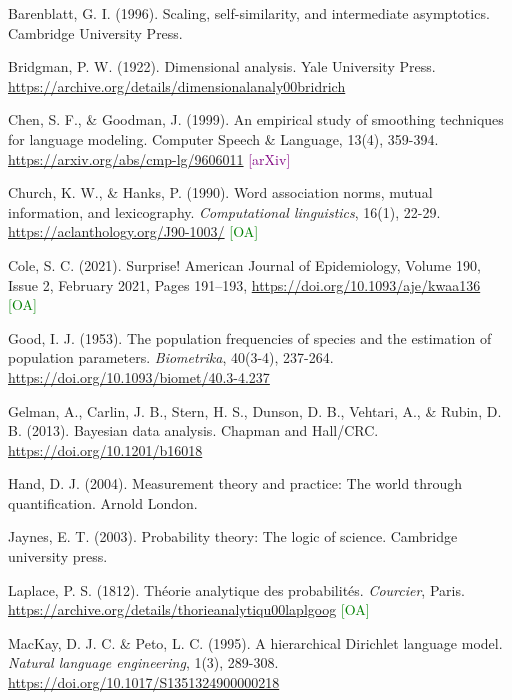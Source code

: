 \documentclass[12pt,a4paper]{article}
\newcommand{\openaccess}{{\small\textcolor{green}{[OA]}}}
\newcommand{\arxiv}{{\small\textcolor{purple}{[arXiv]}}}
\begin{document}

\begin{thebibliography}{9}

 Barenblatt, G. I. (1996).
    Scaling, self-similarity, and intermediate asymptotics.
    Cambridge University Press.

 Bridgman, P. W. (1922).
    Dimensional analysis.
    Yale University Press.
    \url{https://archive.org/details/dimensionalanaly00bridrich}

 Chen, S. F., \& Goodman, J. (1999).
    An empirical study of smoothing techniques for language modeling.
    Computer Speech \& Language, 13(4), 359-394.
    \url{https://arxiv.org/abs/cmp-lg/9606011}
    \arxiv

 Church, K. W., \& Hanks, P. (1990). 
    Word association norms, mutual information, and lexicography.
    \textit{Computational linguistics}, 16(1), 22-29.
    \url{https://aclanthology.org/J90-1003/}
    \openaccess
    
 Cole, S. C. (2021).
    Surprise!
    American Journal of Epidemiology, Volume 190, Issue 2, February 2021, Pages 191–193,
    \url{https://doi.org/10.1093/aje/kwaa136}
    \openaccess

 Good, I. J. (1953).
    The population frequencies of species and the estimation of population parameters.
    \textit{Biometrika}, 40(3-4), 237-264.
    \url{https://doi.org/10.1093/biomet/40.3-4.237}

 Gelman, A., Carlin, J. B., Stern, H. S., 
    Dunson, D. B., Vehtari, A., \& Rubin, D. B. (2013).
    Bayesian data analysis.
    Chapman and Hall/CRC.
    \url{https://doi.org/10.1201/b16018}

 Hand, D. J. (2004).
    Measurement theory and practice: The world through quantification.
    Arnold London.

 Jaynes, E. T. (2003). 
    Probability theory: The logic of science.
    Cambridge university press.

 Laplace, P. S. (1812).
    Théorie analytique des probabilités.
    \textit{Courcier}, Paris.
    \url{https://archive.org/details/thorieanalytiqu00laplgoog}
    \openaccess

 MacKay, D. J. C. \& Peto, L. C. (1995).
    A hierarchical Dirichlet language model.
    \textit{Natural language engineering}, 1(3), 289-308.
    \url{https://doi.org/10.1017/S1351324900000218}


\end{thebibliography}
\end{document}
